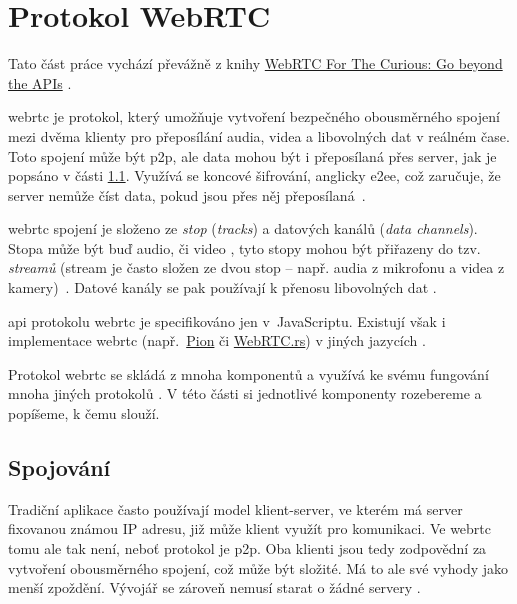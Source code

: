 \section{Protokol WebRTC}\label{webRTC}

Tato část práce vychází převážně z knihy
\href{https://webrtcforthecurious.com/}{WebRTC For The Curious: Go beyond the
    APIs} \parencite{WebRTCForTheCurious}.

\gls{webrtc} je protokol, který umožňuje vytvoření bezpečného obousměrného
spojení mezi dvěma klienty pro přeposílání audia, videa a libovolných dat v
reálném čase. Toto spojení může být \gls{p2p}, ale data mohou být i přeposílaná
přes server, jak je popsáno v části \ref{connecting}. Využívá se koncové
šifrování, anglicky \gls{e2ee}, což zaručuje, že server nemůže číst data, pokud
jsou přes něj přeposílaná~\parencite{WebRTCForTheCurious}.

\gls{webrtc} spojení je složeno ze \textit{stop} (\textit{tracks}) a datových
kanálů (\textit{data channels}). Stopa může být buď audio, či video
\parencite{MDN-WebRTC-MediaStreamTrack}, tyto stopy mohou být přiřazeny do tzv.
\textit{streamů} (stream je často složen ze dvou stop -- např. audia z mikrofonu
a videa z kamery)~\parencite{MDN-WebRTC-MediaStream}. Datové kanály se pak
používají k přenosu libovolných dat
\parencite{WebRTCORG-GettingStarted-DataChannels}.

\gls{api} protokolu \gls{webrtc} je specifikováno jen v~JavaScriptu. Existují
však i implementace \gls{webrtc}
(např.~\href{https://github.com/pion/webrtc}{Pion} či
\href{https://github.com/webrtc-rs/webrtc}{WebRTC.rs}) v jiných jazycích
\parencite{WebRTCForTheCurious,GitHub-Pion-WebRTC,GitHub-WebRTCRS-WebRTC}.

Protokol \gls{webrtc} se skládá z mnoha komponentů a využívá ke svému fungování
mnoha jiných protokolů \parencite{WebRTCForTheCurious}. V této části si
jednotlivé komponenty rozebereme a popíšeme, k čemu slouží.

\subsection{Spojování}\label{connecting}

Tradiční aplikace často používají model klient-server, ve kterém má server
fixovanou známou IP adresu, již může klient využít pro komunikaci. Ve
\gls{webrtc} tomu ale tak není, neboť protokol je \gls{p2p}. Oba klienti jsou
tedy zodpovědní za vytvoření obousměrného spojení, což může být složité. Má to
ale své vyhody jako menší zpoždění. Vývojář se zároveň nemusí starat o žádné
servery \parencite{WebRTCForTheCurious}.

